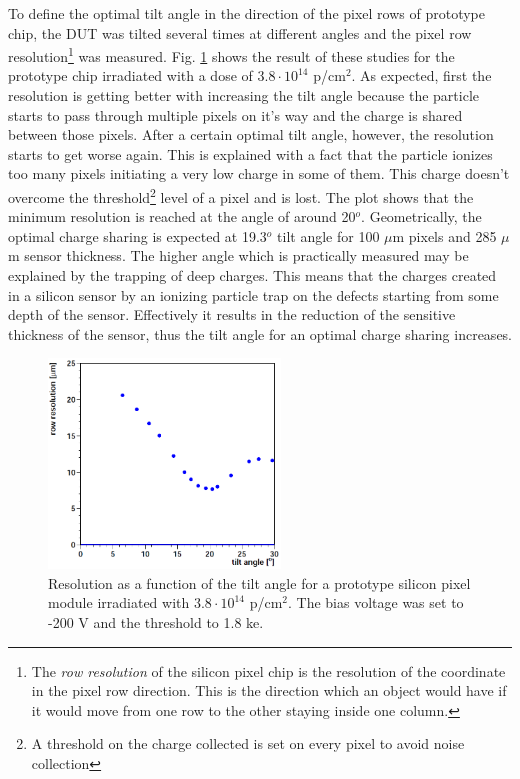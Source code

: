 To define the optimal tilt angle in the direction of the pixel rows of prototype chip, the DUT was tilted several times at different angles and the 
pixel row resolution\footnote{The \textit{row resolution} of the silicon pixel chip is the resolution of the coordinate in the pixel row direction. This
is the direction which an object would have if it would move from one row to the other staying inside one column.} was measured. Fig. \ref{fig:tilt_scan} 
shows the result of these studies for the prototype chip irradiated with a dose of $3.8 \cdot 10^{14}$ p/cm$^2$. As expected, first the resolution is 
getting better with increasing the tilt angle because the particle starts to pass through multiple pixels on it's way and the charge is shared between 
those pixels. After a certain optimal tilt angle, however, the resolution starts to get worse again. This is explained with a fact that the particle 
ionizes too many pixels initiating a very low charge in some of them. This charge doesn't overcome the threshold\footnote{A threshold on the charge 
collected is set on every pixel to avoid noise collection} level of a pixel and is lost. The plot shows that the minimum resolution is reached at 
the angle of around 20$^{o}$. Geometrically, the optimal charge sharing is expected at 19.3$^{o}$ tilt angle for 100 $\mu$m pixels and 285 $\mu$m 
sensor thickness. The higher angle which is practically measured may be explained by the trapping of deep charges. This means that the charges 
created in a silicon sensor by an ionizing particle trap on the defects starting from some depth of the sensor. Effectively it results in the
reduction of the sensitive thickness of the sensor, thus the tilt angle for an optimal charge sharing increases.

\begin{figure}[t]
 \centering
 \includegraphics[width=0.55\textwidth]{021_pixel_upgrade/plots/tilt_scan.png}
 \caption{Resolution as a function of the tilt angle for a prototype silicon pixel module irradiated with $3.8 \cdot 10^{14}$ p/cm$^2$. The bias voltage  
 was set to -200 V and the threshold to 1.8 ke.}
 \label{fig:tilt_scan}
\end{figure}

